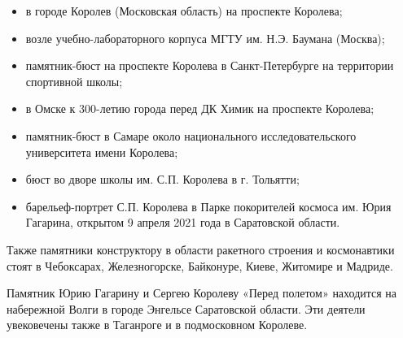 \begin{itemize}
  \item в городе Королев (Московская область) на проспекте Королева;
  \item возле учебно-лабораторного корпуса МГТУ им. Н.Э. Баумана (Москва);
  \item памятник-бюст на проспекте Королева в Санкт-Петербурге на территории спортивной школы;
  \item в Омске к 300-летию города перед ДК Химик на проспекте Королева;
  \item памятник-бюст в Самаре около национального исследовательского университета имени Королева;
  \item бюст во дворе школы им. С.П. Королева в г. Тольятти;
  \item барельеф-портрет С.П. Королева в Парке покорителей космоса им. Юрия Гагарина, открытом 9 апреля 2021 года в Саратовской области.
\end{itemize}

Также памятники конструктору в области ракетного строения и космонавтики стоят
в Чебоксарах, Железногорске, Байконуре, Киеве, Житомире и Мадриде.

Памятник Юрию Гагарину и Сергею Королеву «Перед полетом» находится на
набережной Волги в городе Энгельсе Саратовской области. Эти деятели увековечены
также в Таганроге и в подмосковном Королеве.
